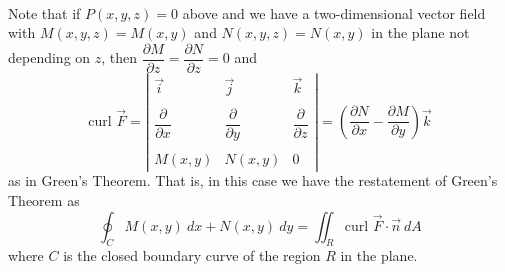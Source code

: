 \\

Note that if $P(x,y,z) = 0$ above and we have a two-dimensional vector field with $M(x,y,z) = M(x,y)$ and $N(x,y,z) = N(x,y)$ in the plane not depending on $z$, then $\dfrac{\partial M}{\partial z} = \dfrac{\partial N}{\partial z} = 0$ and
$$\text{curl } \vec F = \left| \begin{array}{ccc} \vec i & \vec j & \vec k \\ & & \\ \dfrac{\partial}{\partial x} & \dfrac{\partial}{\partial y} & \dfrac{\partial}{\partial z} \\ &  & \\ M(x,y) & N(x,y) & 0 \end{array} \right| = \left(\dfrac{\partial N}{\partial x} - \dfrac{\partial M}{\partial y} \right) \vec k$$
as in Green's Theorem.  That is, in this case we have the restatement of Green's Theorem as
$$\oint_C M(x,y) \: dx + N(x,y) \: dy = \iint_R \text{curl } \vec F \cdot \vec n \: dA$$
where $C$ is the closed boundary curve of the region $R$ in the plane.\\

